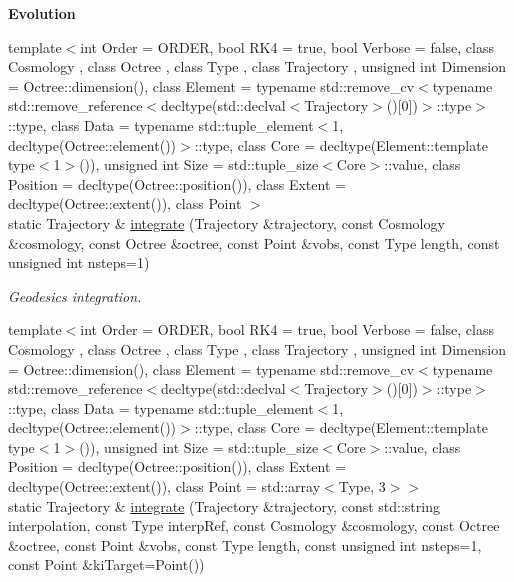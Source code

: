 \begin{Indent}{\bf Evolution}\par
\begin{DoxyCompactItemize}
\item 
{\footnotesize template$<$int Order = O\-R\-D\-E\-R, bool R\-K4 = true, bool Verbose = false, class Cosmology , class Octree , class Type , class Trajectory , unsigned int Dimension = Octree\-::dimension(), class Element  = typename std\-::remove\-\_\-cv$<$typename std\-::remove\-\_\-reference$<$decltype(std\-::declval$<$\-Trajectory$>$()\mbox{[}0\mbox{]})$>$\-::type$>$\-::type, class Data  = typename std\-::tuple\-\_\-element$<$1, decltype(\-Octree\-::element())$>$\-::type, class Core  = decltype(\-Element\-::template type$<$1$>$()), unsigned int Size = std\-::tuple\-\_\-size$<$\-Core$>$\-::value, class Position  = decltype(\-Octree\-::position()), class Extent  = decltype(\-Octree\-::extent()), class Point $>$ }\\static Trajectory \& \hyperlink{exceptionIntegrator_a9b8a5ecc2a7ee7742d5c96b0d85b0824}{integrate} (Trajectory \&trajectory, const Cosmology \&cosmology, const Octree \&octree, const Point \&vobs, const Type length, const unsigned int nsteps=1)
\begin{DoxyCompactList}\small\item\em Geodesics integration. \end{DoxyCompactList}\item 
{\footnotesize template$<$int Order = O\-R\-D\-E\-R, bool R\-K4 = true, bool Verbose = false, class Cosmology , class Octree , class Type , class Trajectory , unsigned int Dimension = Octree\-::dimension(), class Element  = typename std\-::remove\-\_\-cv$<$typename std\-::remove\-\_\-reference$<$decltype(std\-::declval$<$\-Trajectory$>$()\mbox{[}0\mbox{]})$>$\-::type$>$\-::type, class Data  = typename std\-::tuple\-\_\-element$<$1, decltype(\-Octree\-::element())$>$\-::type, class Core  = decltype(\-Element\-::template type$<$1$>$()), unsigned int Size = std\-::tuple\-\_\-size$<$\-Core$>$\-::value, class Position  = decltype(\-Octree\-::position()), class Extent  = decltype(\-Octree\-::extent()), class Point  = std\-::array$<$\-Type, 3$>$$>$ }\\static Trajectory \& \hyperlink{exceptionIntegrator_af32fdd6a60fdf84c2a23522ceadfd169}{integrate} (Trajectory \&trajectory, const std\-::string interpolation, const Type interp\-Ref, const Cosmology \&cosmology, const Octree \&octree, const Point \&vobs, const Type length, const unsigned int nsteps=1, const Point \&ki\-Target=Point())

\end{DoxyCompactItemize}
\end{Indent}
